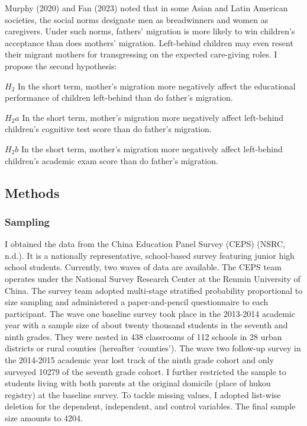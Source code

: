 \documentclass[
  man]{apa7}
\begin{document}
Murphy (2020) and Fan (2023) noted that in some Asian and Latin American societies, the social norms designate men as breadwinners and women as caregivers. Under such norms, fathers' migration is more likely to win children's acceptance than does mothers' migration. Left-behind children may even resent their migrant mothers for transgressing on the expected care-giving roles. I propose the second hypothesis:

\(H_2\) In the short term, mother's migration more negatively affect the educational performance of children left-behind than do father's migration.

\(H_2a\) In the short term, mother's migration more negatively affect left-behind children's cognitive test score than do father's migration.

\(H_2b\) In the short term, mother's migration more negatively affect left-behind children's academic exam score than do father's migration.

\hypertarget{methods}{%
\subsection{Methods}\label{methods}}

\hypertarget{sampling}{%
\subsubsection{Sampling}\label{sampling}}

I obtained the data from the China Education Panel Survey (CEPS) (NSRC, n.d.). It is a nationally representative, school-based survey featuring junior high school students. Currently, two waves of data are available. The CEPS team operates under the National Survey Research Center at the Renmin University of China. The survey team adopted multi-stage stratified probability proportional to size sampling and administered a paper-and-pencil questionnaire to each participant. The wave one baseline survey took place in the 2013-2014 academic year with a sample size of about twenty thousand students in the seventh and ninth grades. They were nested in 438 classrooms of 112 schools in 28 urban districts or rural counties (hereafter `counties'). The wave two follow-up survey in the 2014-2015 academic year lost track of the ninth grade cohort and only surveyed 10279 of the seventh grade cohort. I further restricted the sample to students living with both parents at the original domicile (place of hukou registry) at the baseline survey. To tackle missing values, I adopted list-wise deletion for the dependent, independent, and control variables. The final sample size amounts to 4204.
\end{document}
